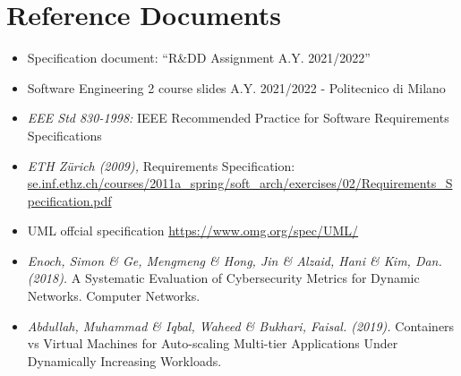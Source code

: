 \section{Reference Documents}

\begin{itemize}
    \item Specification document: “R\&DD Assignment A.Y. 2021/2022”
    \item Software Engineering 2 course slides A.Y. 2021/2022 - Politecnico di Milano
    \item \textit{EEE Std 830-1998:} IEEE Recommended Practice for Software Requirements Specifications
    \item \textit{ETH Zürich (2009),} Requirements Specification:\\ \url{se.inf.ethz.ch/courses/2011a_spring/soft_arch/exercises/02/Requirements_Specification.pdf} 
    \item UML offcial specification \url{https://www.omg.org/spec/UML/}
    \item \textit{Enoch, Simon \& Ge, Mengmeng \& Hong, Jin \& Alzaid, Hani \& Kim, Dan. (2018).} A Systematic Evaluation of Cybersecurity Metrics for Dynamic Networks. Computer Networks.
    \item \textit{Abdullah, Muhammad \& Iqbal, Waheed \& Bukhari, Faisal. (2019).} Containers vs Virtual Machines for Auto-scaling Multi-tier Applications Under Dynamically Increasing Workloads.
\end{itemize}

